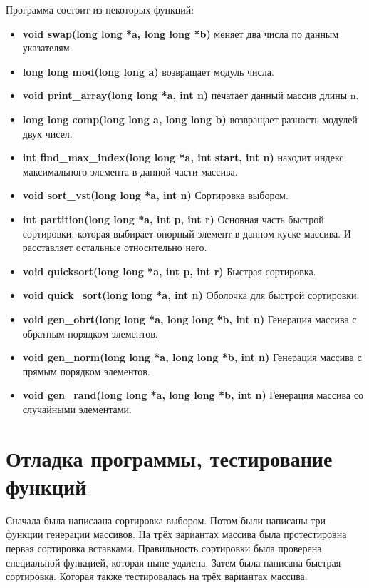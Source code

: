 \documentclass[a4paper,12pt,titlepage,final]{article}
\begin{document}
Программа состоит из некоторых функций:
\begin{itemize}
  \item {\bf \ttfamily void swap(long long *a, long long *b)} меняет два числа по данным указателям.
  \item {\bf \ttfamily long long mod(long long a)} возвращает модуль числа.
  \item {\bf \ttfamily void print\_array(long long *a, int n)} печатает данный массив длины n.
  \item {\bf \ttfamily long long comp(long long a, long long b)} возвращает разность модулей двух чисел.
  \item {\bf \ttfamily int find\_max\_index(long long *a, int start, int n)} находит индекс максимального элемента в данной части массива.
  \item {\bf \ttfamily void sort\_vst(long long *a, int n)} Сортировка выбором.
  \item {\bf \ttfamily int partition(long long *a, int p, int r)} Основная часть быстрой сортировки, которая выбирает опорный элемент в данном куске массива. И расставляет остальные относительно него.
  \item {\bf \ttfamily void quicksort(long long *a, int p, int r)} Быстрая сортировка.
  \item {\bf \ttfamily void quick\_sort(long long *a, int n)} Оболочка для быстрой сортировки.
  \item {\bf \ttfamily void gen\_obrt(long long *a, long long *b, int n)} Генерация массива с обратным порядком элементов.
  \item {\bf \ttfamily void gen\_norm(long long *a, long long *b, int n)} Генерация массива с прямым порядком элементов.
  \item {\bf \ttfamily void gen\_rand(long long *a, long long *b, int n)} Генерация массива со случайными элементами.
\end{itemize}

\newpage

\section{Отладка программы, тестирование функций}

Сначала была написаана сортировка выбором. Потом были написаны три функции генерации массивов.
На трёх вариантах массива была протестировна первая сортировка вставками. Правильность сортировки была проверена специальной функцией, которая ныне удалена. Затем была написана быстрая сортировка. Которая также тестировалась на трёх вариантах массива. 
\end{document}
